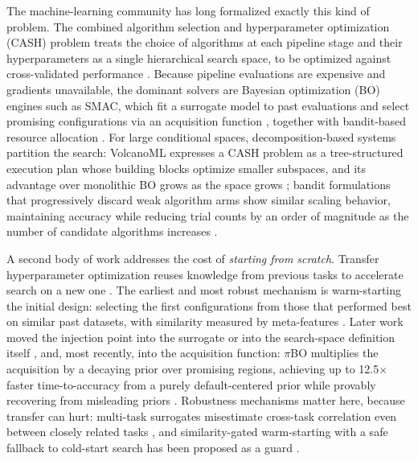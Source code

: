 The machine-learning community has long formalized exactly this kind of problem. The combined algorithm selection and hyperparameter optimization (CASH) problem treats the choice of algorithms at each pipeline stage and their hyperparameters as a single hierarchical search space, to be optimized against cross-validated performance \cite{KotthoffEtAl2019, HutterEtAl2019}. Because pipeline evaluations are expensive and gradients unavailable, the dominant solvers are Bayesian optimization (BO) engines such as SMAC, which fit a surrogate model to past evaluations and select promising configurations via an acquisition function \cite{LindauerEtAl2021, BergstraEtAl2015, AkibaEtAl2019}, together with bandit-based resource allocation \cite{LiEtAl2016, FalknerEtAl2018}. For large conditional spaces, decomposition-based systems partition the search: VolcanoML expresses a CASH problem as a tree-structured execution plan whose building blocks optimize smaller subspaces, and its advantage over monolithic BO grows as the space grows \cite{LiEtAl2021b, LiEtAl2022a}; bandit formulations that progressively discard weak algorithm arms show similar scaling behavior, maintaining accuracy while reducing trial counts by an order of magnitude as the number of candidate algorithms increases \cite{LiEtAl2020a}.

A second body of work addresses the cost of \emph{starting from scratch}. Transfer hyperparameter optimization reuses knowledge from previous tasks to accelerate search on a new one \cite{BaiEtAl2023, Vanschoren2019}. The earliest and most robust mechanism is warm-starting the initial design: selecting the first configurations from those that performed best on similar past datasets, with similarity measured by meta-features \cite{FeurerEtAl2015}. Later work moved the injection point into the surrogate \cite{WistubaGrabocka2021, LiEtAl2022c} or into the search-space definition itself \cite{LiEtAl2022d, PerroneEtAl2019}, and, most recently, into the acquisition function: $\pi$BO multiplies the acquisition by a decaying prior over promising regions, achieving up to 12.5$\times$ faster time-to-accuracy from a purely default-centered prior while provably recovering from misleading priors \cite{HvarfnerEtAl2022}. Robustness mechanisms matter here, because transfer can hurt: multi-task surrogates misestimate cross-task correlation even between closely related tasks \cite{HvarfnerEtAl2026}, and similarity-gated warm-starting with a safe fallback to cold-start search has been proposed as a guard \cite{NomuraEtAl2021}.

